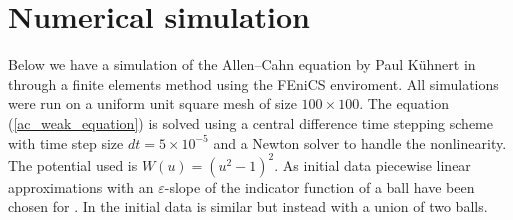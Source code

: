 \section{Numerical simulation}

Below we have a simulation of the Allen--Cahn equation by Paul Kühnert in 
\cite{kuehner_simulation} through a finite elements method using the FEniCS 
enviroment. 
All simulations were run on a uniform unit square mesh of 
size $ 100 \times 100 $. The equation (\ref{ac_weak_equation}) is solved 
using a central difference time stepping scheme with time step size $ dt = 5 
\times 10^{ - 5 } $ and a Newton solver to handle the nonlinearity.
The potential used is $ W ( u ) = ( u^2 - 1 )^2 $. As initial data piecewise 
linear approximations with an $ \varepsilon $-slope of the indicator function 
of a ball have been chosen for . In 
 the initial data is similar but instead 
with a union of two balls.
